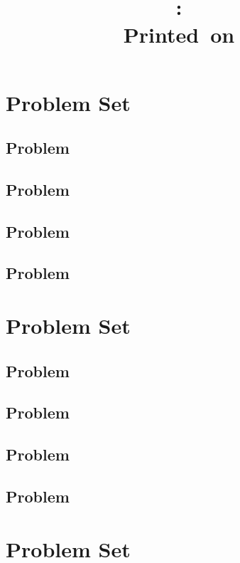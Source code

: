 \documentclass[17pt,UTF-8,a4paper]{ctexart}
\title{
    \vspace{2in}
    \textmd{\textbf{\hmwkClass:\ \hmwkTitle}}\\
    \normalsize\vspace{0.1in}\small{Printed\ on\ \hmwkDueDate}\\
    \vspace{0.1in}\large{\textit{\hmwkClassInstructor}}
    \vspace{3in}
}
\author{\hmwkAuthorName}
\date{}
\begin{document}


\section{Problem Set}

\subsection{Problem}



\subsection{Problem}

\subsection{Problem}

\subsection{Problem}

\section{Problem Set}

\subsection{Problem}

\subsection{Problem}

\subsection{Problem}

\subsection{Problem}



\section{Problem Set}
\end{document}
